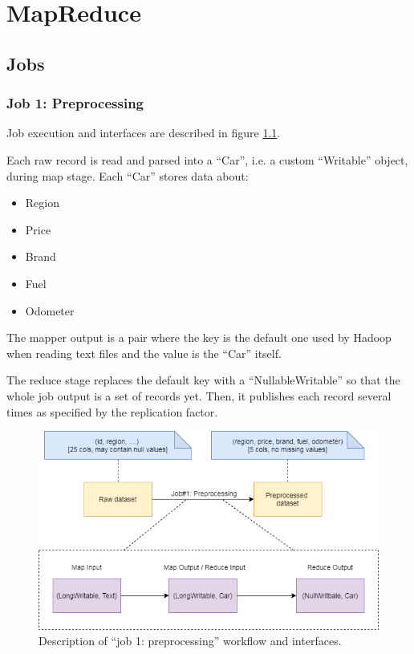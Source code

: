 \chapter{MapReduce}

\section{Jobs}

\subsection{Job 1: Preprocessing}

Job execution and interfaces are described in figure \ref{fig:MR-job-1}.
 
Each raw record is read and parsed into a ``Car'', i.e. a custom ``Writable'' object, during map stage. 
Each ``Car'' stores data about:
\begin{itemize}
 \item Region
 \item Price
 \item Brand
 \item Fuel
 \item Odometer
\end{itemize}

The mapper output is a pair where the key is the default one used by Hadoop when reading text files and the value is the ``Car'' itself.

The reduce stage replaces the default key with a ``NullableWritable'' so that the whole job output is a set of records yet. Then, it publishes each record several times as specified by the replication factor.

\begin{figure}[H]
	\centering
	\includegraphics[scale=0.7]{images/2-mapreduce/MR-job-1.png}
	\caption{Description of ``job 1: preprocessing'' workflow and interfaces.}
	\label{fig:MR-job-1}
\end{figure}

